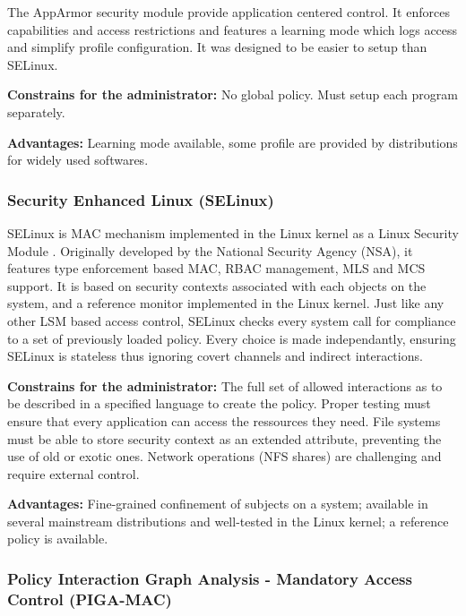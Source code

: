 \documentclass[pdftex,a4paper,titlepage,11pt]{article}
\begin{document}
The AppArmor security module provide application centered control. It enforces
capabilities and access restrictions and features a learning mode which logs
access and simplify profile configuration. It was designed to be easier to setup
than SELinux.

\begin{list}{}{}
 \item \textbf{Constrains for the administrator:} No global policy. Must setup
each program separately.
 \item \textbf{Advantages:} Learning mode available, some profile are provided
by distributions for widely used softwares.
\end{list}

\subsubsection{Security Enhanced Linux (SELinux)}

SELinux is MAC mechanism implemented in the Linux kernel as a Linux Security
Module \cite{lsm2002linux}. Originally developed by the National Security
Agency (NSA), it features type enforcement based MAC, RBAC management, MLS and
MCS support. It is based on security contexts associated with each objects on
the system, and a reference monitor implemented in the Linux kernel. Just like
any other LSM based access control, SELinux checks every system call for
compliance to a set of previously loaded policy. Every choice is made
independantly, ensuring SELinux is stateless thus ignoring covert channels and
indirect interactions.

\begin{list}{}{}
 \item \textbf{Constrains for the administrator:} The full set of allowed
interactions as to be described in a specified language to create the policy.
Proper testing must ensure that every application can access the ressources
they need. File systems must be able to store security context as an extended
attribute, preventing the use of old or exotic ones. Network operations (NFS
shares) are challenging and require external control.
 \item \textbf{Advantages:} Fine-grained confinement of subjects on a
system; available in several mainstream distributions and well-tested in the
Linux kernel; a reference policy is available.
\end{list}

\subsubsection{Policy Interaction Graph Analysis - Mandatory Access Control
(PIGA-MAC)}
\end{document}
